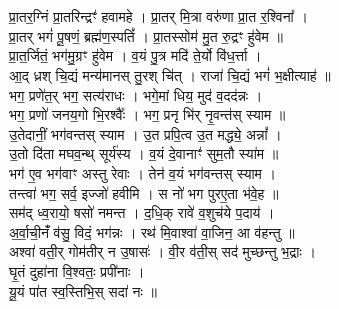 \section{}
प्रा॒तर॒ग्निं प्रा॒तरिन्द्रꣳ॑ हवामहे । प्रा॒तर् मि॒त्रा वरु॑णा प्रा॒त र॒श्विना᳚ ।\\
प्रा॒तर् भगं॑ पू॒षणं॒ ब्रह्म॑ण॒स्पतिं᳚ । प्रा॒तस्सोम॑ मु॒त रु॒द्रꣳ हु॑वेम ॥\\
प्रा॒त॒र्जितं॒ भग॑मु॒ग्रꣳ हु॑वेम । व॒यं पु॒त्र मदि॑ ते॒र्यो वि॑ध॒र्त्ता ।\\
आ॒द् ध्रश् चि॒द्यं मन्य॑मानस् तु॒रश् चि॑त् । राजा॑ चि॒द्यं भगं॑ भ॒क्षीत्याह॑ ॥\\
भग॒ प्रणे॑त॒र् भग॒ सत्य॑राधः । भगे॒मां धिय॒ मुद॑ व॒दद॑न्नः ।\\
भग॒ प्रणो॑ जनय॒गो भि॒रश्वैः᳚ । भग॒ प्रनृ भि॑र् नृ॒वन्त॑स् स्याम ॥\\
उ॒तेदानीं॒ भग॑वन्तस् स्याम । उ॒त प्रपि॒त्व उ॒त मद्ध्ये॒ अन्नां᳚ ।\\
उ॒तो दि॑ता मघव॒न्थ् सूर्य॑स्य । व॒यं दे॒वानाꣳ॑ सुम॒तौ स्या॑म ॥\\
भग॑ ए॒व भग॑वाꣳ अस्तु रेवाः । तेन॑ व॒यं भग॑वन्तस् स्याम ।\\
तन्त्वा॑ भग॒ सर्व॒ इज्जो॑ हवीमि । स नो॑ भग पुरए॒ता भ॑वे॒ह ॥\\
सम॑द् ध्व॒रायो॒ षसो॑ नमन्त । द॒धि॒क् रावे॑ व॒शुच॑ये प॒दाय॑ ।\\
अ॒र्वा॒ची॒नंँ व॑सु॒ विदं॒ भग॑न्नः । रथ॑ मि॒वाश्वा॑ वा॒जिन॒ आ व॑हन्तु ॥\\
अश्वा॑ वती॒र् गोम॑तीर् न उ॒षासः॑ । वी॒र व॑ती॒स् सद॑ मुच्छन्तु भ॒द्राः ।\\
घृ॒तं दुहा॑ना वि॒श्वतः॒ प्रपी॑नाः ।\\
यू॒यं पा॑त स्व॒स्तिभि॒स् सदा॑ नः ॥\\
